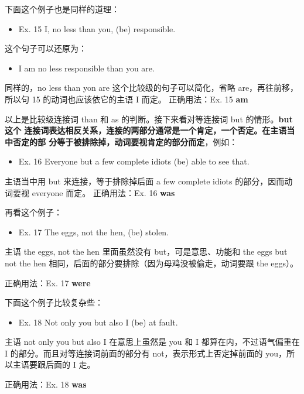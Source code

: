 下面这个例子也是同样的道理：
\begin{mybox}

  \begin{itemize}
  \item   Ex. 15 I, no less than you, (be) responsible.
  \end{itemize}
  这个句子可以还原为：
  \begin{itemize}
  \item   I am no less responsible than you are.
  \end{itemize}
  同样的，no less than yon are 这个比较级的句子可以简化，省略
  are，再往前移，所以句 15 的动词也应该依它的主语 I 而定。
  \tcblower
  正确用法：Ex. 15 \textbf{am}
\end{mybox}

以上是比较级连接词 than 和 as 的判断。接下来看对等连接词 but 的情形。\textbf{but这个
  连接词表达相反关系，连接的两部分通常是一个肯定，一个否定。在主语当中否定的部
  分等于被排除掉，动词要视肯定的部分而定}，例如：
\begin{mybox}
  \begin{itemize}
  \item   Ex. 16 Everyone but a few complete idiots (be) able to see that.
  \end{itemize}

  主语当中用 but 来连接，等于排除掉后面 a few complete idiots
  的部分，因而动词要视 everyone 而定。
  \tcblower
  正确用法：Ex. 16 \textbf{was}
\end{mybox}

再看这个例子：
\begin{mybox}
  \begin{itemize}
  \item   Ex. 17 The eggs, not the hen, (be) stolen.
  \end{itemize}

  主语 the eggs, not the hen 里面虽然没有 but，可是意思、功能和 the eggs but
  not the hen 相同，后面的部分要排除（因为母鸡没被偷走，动词要跟 the
  eggs）。

  \tcblower

  正确用法：Ex. 17 \textbf{were}
\end{mybox}

下面这个例子比较复杂些：
\begin{mybox}

  \begin{itemize}
  \item   Ex. 18 Not only you but also I (be) at fault.
  \end{itemize}

  主语 not only you but also I 在意思上虽然是 you 和 I
  都算在内，不过语气偏重在 I 的部分。而且对等连接词前面的部分有
  not，表示形式上否定掉前面的 you，所以主语要跟后面的 I 走。

  \tcblower

  正确用法：Ex. 18 \textbf{was}
\end{mybox}

